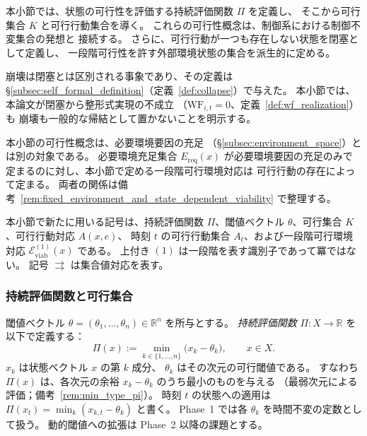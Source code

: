 本小節では、状態の可行性を評価する持続評価関数 $\Pi$ を定義し、
そこから可行集合 $K$ と可行行動集合を導く。
これらの可行性概念は、制御系における制御不変集合の発想と
接続する\cite{Blanchini1999}。
さらに、可行行動が一つも存在しない状態を閉塞として定義し、
一段階可行性を許す外部環境状態の集合を派生的に定める。

崩壊は閉塞とは区別される事象であり、その定義は
\S\ref{subsec:self_formal_definition}（定義~\ref{def:collapse}）で与えた。
本小節では、本論文が閉塞から整形式実現の不成立
（$\mathrm{WF}_{i,t}=0$、定義~\ref{def:wf_realization}）も
崩壊も一般的な帰結として置かないことを明示する。

本小節の可行性概念は、必要環境要因の充足
（\S\ref{subsec:environment_space}）とは別の対象である。
必要環境充足集合 $E_{\mathrm{req}}(x)$ が必要環境要因の充足のみで
定まるのに対し、本小節で定める一段階可行環境対応は
可行行動の存在によって定まる。
両者の関係は備考~\ref{rem:fixed_environment_and_state_dependent_viability}
で整理する。

本小節で新たに用いる記号は、持続評価関数 $\Pi$、閾値ベクトル
$\theta$、可行集合 $K$、可行行動対応 $A(x,e)$、
時刻 $t$ の可行行動集合 $A_t$、および一段階可行環境対応
$\mathcal{E}_{\mathrm{viab}}^{(1)}(x)$ である。
上付き $(1)$ は一段階を表す識別子であって冪ではない。
記号 $\rightrightarrows$ は集合値対応を表す。

\subsubsection{持続評価関数と可行集合}

\begin{definition}[持続評価関数]
\label{def:Pi}
閾値ベクトル $\theta = (\theta_1, \ldots, \theta_n)
\in\mathbb{R}^n$ を所与とする。
\emph{持続評価関数} $\Pi : X \to\mathbb{R}$ を
以下で定義する：
\[
  \Pi(x) := \min_{k\in\{1,\ldots,n\}}
  \bigl(x_k - \theta_k\bigr),
  \qquad
  x\in X.
\]
$x_k$ は状態ベクトル $x$ の第 $k$ 成分、
$\theta_k$ はその次元の可行閾値である。
すなわち $\Pi(x)$ は、各次元の余裕
$x_k - \theta_k$ のうち最小のものを与える
（最弱次元による評価；備考~\ref{rem:min_type_pi}）。
時刻 $t$ の状態への適用は
$\Pi(x_t)=\min_k(x_{k,t}-\theta_k)$ と書く。
Phase~1 では各 $\theta_k$ を時間不変の定数として扱う。
動的閾値への拡張は Phase~2 以降の課題とする。
\end{definition}

